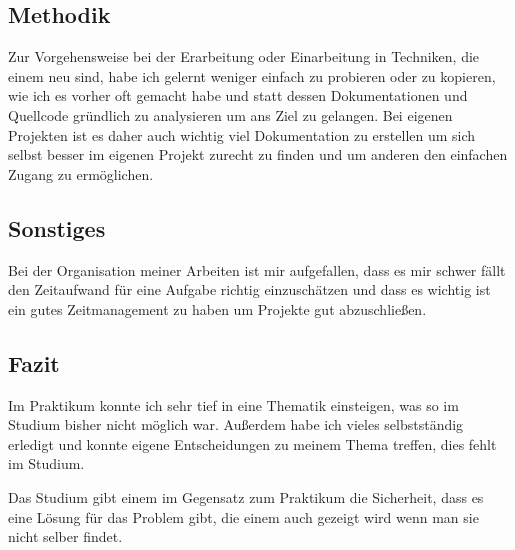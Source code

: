 \documentclass[pdftex,12pt,a4paper]{scrreprt}
\begin{document}
\subsection{Methodik}
Zur Vorgehensweise bei der Erarbeitung oder Einarbeitung in Techniken, die einem neu sind, habe ich gelernt weniger einfach zu probieren oder zu kopieren, wie ich es vorher oft gemacht habe und statt dessen Dokumentationen und Quellcode gründlich zu analysieren um ans Ziel zu gelangen.
Bei eigenen Projekten ist es daher auch wichtig viel Dokumentation zu erstellen um sich selbst besser im eigenen Projekt zurecht zu finden und um anderen den einfachen Zugang zu ermöglichen.
\subsection{Sonstiges}
Bei der Organisation meiner Arbeiten ist mir aufgefallen, dass es mir schwer fällt den Zeitaufwand für eine Aufgabe richtig einzuschätzen und dass es wichtig ist ein gutes Zeitmanagement zu haben um Projekte gut abzuschließen.
\subsection{Fazit}
Im Praktikum konnte ich sehr tief in eine Thematik einsteigen, was so im Studium bisher nicht möglich war. Außerdem habe ich vieles selbstständig erledigt und konnte eigene Entscheidungen zu meinem Thema treffen, dies fehlt im Studium.

Das Studium gibt einem im Gegensatz zum Praktikum die Sicherheit, dass es eine Lösung für das Problem gibt, die einem auch gezeigt wird wenn man sie nicht selber findet.
\end{document}
